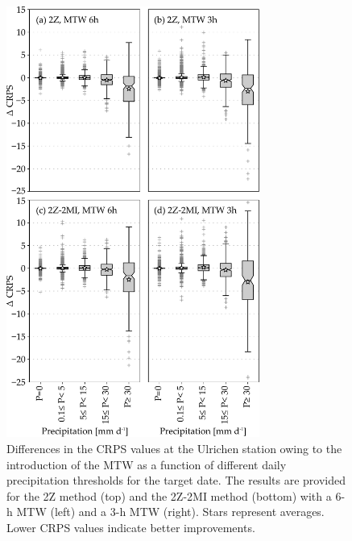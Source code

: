 \documentclass[hess, manuscript]{copernicus}
\begin{document}
	\begin{figure}[htb]
		\includegraphics[width=8.3cm]{fig11.pdf}
		\caption{Differences in the CRPS values at the Ulrichen station owing to the introduction of the MTW as a function of different daily precipitation thresholds for the target date. The results are provided for the 2Z method (top) and the 2Z-2MI method (bottom) with a 6-h MTW (left) and a 3-h MTW (right). Stars represent averages. Lower CRPS values indicate better improvements.}
		\label{fig:changes_CRPS_precip_threshold}
	\end{figure}
	
\end{document}

